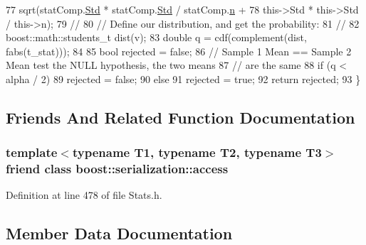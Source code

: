 \begin{DoxyCode}
77                     sqrt(statComp.\hyperlink{class_soil_math_1_1_stats_a6af590b7d033d882d5428c0d7a1f5e59}{Std} * statComp.\hyperlink{class_soil_math_1_1_stats_a6af590b7d033d882d5428c0d7a1f5e59}{Std} / statComp.\hyperlink{class_soil_math_1_1_stats_a7bc57af334b68253832ebac17f85d091}{n} +
78                          this->Std * this->Std / this->n);
79     \textcolor{comment}{//}
80     \textcolor{comment}{// Define our distribution, and get the probability:}
81     \textcolor{comment}{//}
82     boost::math::students\_t dist(v);
83     \textcolor{keywordtype}{double} q = cdf(complement(dist, fabs(t\_stat)));
84 
85     \textcolor{keywordtype}{bool} rejected = \textcolor{keyword}{false};
86     \textcolor{comment}{// Sample 1 Mean == Sample 2 Mean test the NULL hypothesis, the two means}
87     \textcolor{comment}{// are the same}
88     \textcolor{keywordflow}{if} (q < alpha / 2)
89       rejected = \textcolor{keyword}{false};
90     \textcolor{keywordflow}{else}
91       rejected = \textcolor{keyword}{true};
92     \textcolor{keywordflow}{return} rejected;
93   \}
\end{DoxyCode}


\subsection{Friends And Related Function Documentation}
\hypertarget{class_soil_math_1_1_stats_ac98d07dd8f7b70e16ccb9a01abf56b9c}{}
\subsubsection[{boost\+::serialization\+::access}]{\setlength{\rightskip}{0pt plus 5cm}template$<$typename T1, typename T2, typename T3$>$ friend class boost\+::serialization\+::access\hspace{0.3cm}{\ttfamily [friend]}}\label{class_soil_math_1_1_stats_ac98d07dd8f7b70e16ccb9a01abf56b9c}


Definition at line 478 of file Stats.\+h.



\subsection{Member Data Documentation}
\hypertarget{class_soil_math_1_1_stats_a00be1d2a705a8aba532fbe726001bbb2}{}
